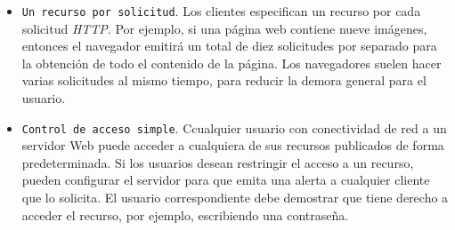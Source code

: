 \begin{itemize}
\begin{itemize}
		\item 	\texttt{Un recurso por solicitud}. Los clientes especifican un recurso por cada  solicitud \textit{HTTP}. Por ejemplo, si una p\'agina web  contiene nueve imágenes,  entonces el navegador emitirá un total de diez solicitudes por separado para la obtención de todo el contenido de la página. Los navegadores suelen hacer varias solicitudes al mismo tiempo, para reducir la demora general para el usuario.
		
		\item \texttt{Control de acceso simple}.  Ccualquier usuario con conectividad de red a un servidor Web puede acceder a cualquiera de sus recursos publicados de forma predeterminada. Si los usuarios desean restringir el acceso a un recurso,  pueden configurar el servidor para que emita una alerta  a cualquier cliente que lo solicita. El usuario correspondiente debe demostrar que tiene derecho a acceder el recurso, por ejemplo, escribiendo una contraseña.
		
	\end{itemize}
	
	
	
	

\end{itemize}
